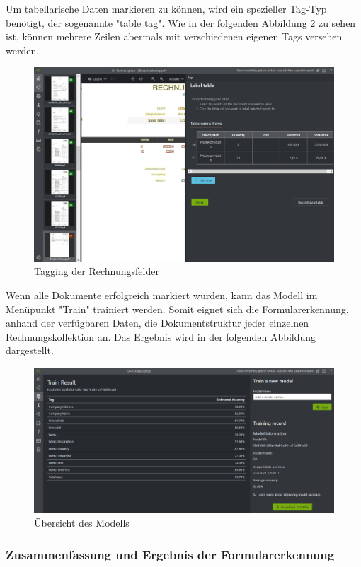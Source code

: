 Um tabellarische Daten markieren zu können, wird ein spezieller Tag-Typ benötigt, der sogenannte "table tag". Wie in der folgenden Abbildung
\ref{fig:formrecognizer-invoice-tagging-items} zu sehen ist, können mehrere Zeilen abermals mit verschiedenen eigenen Tags versehen werden.

\begin{figure}[h]
    \centering
    \includegraphics[scale=0.4]{sections/cloud-computing/images/formrecognizer-invoice-tagging-items.PNG}
    \caption{Tagging der Rechnungsfelder}
    \label{fig:formrecognizer-invoice-tagging-items}
\end{figure}

Wenn alle Dokumente erfolgreich markiert wurden, kann das Modell im Menüpunkt "Train" trainiert werden. Somit eignet sich die Formularerkennung, anhand der
verfügbaren Daten, die Dokumentstruktur jeder einzelnen Rechnungskollektion an. Das Ergebnis wird in der folgenden Abbildung dargestellt.

\begin{figure}[h]
    \centering
    \includegraphics[scale=0.4]{sections/cloud-computing/images/formrecognizer-model-overview.PNG}
    \caption{Übersicht des Modells}
    \label{fig:formrecognizer-invoice-tagging-items}
\end{figure}

\subsubsection{Zusammenfassung und Ergebnis der Formularerkennung}